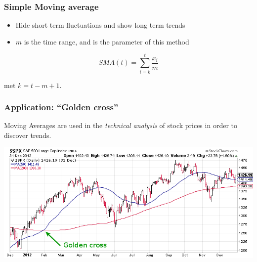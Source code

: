 \documentclass{beamer}
\begin{document}
\begin{frame}
  \frametitle{Simple Moving average}


  \begin{itemize}
    \item Hide short term fluctuations and show long term trends
    \item $m$ is the time range, and is the parameter of this method
  \end{itemize}

  \begin{equation}
    SMA(t) = \sum_{i=k}^{t} \frac{x_{i}}{m}
    \label{eq:movingAverage}
  \end{equation}

  met $k = t - m + 1$.
\end{frame}

\begin{frame}
  \frametitle{Application: ``Golden cross''}

  Moving Averages are used in the \emph{technical analysis} of stock prices in order to discover trends.

  \begin{center}
    \includegraphics[width=\textwidth]{img/tijdreeks-golden-cross}
  \end{center}
\end{frame}
\end{document}
